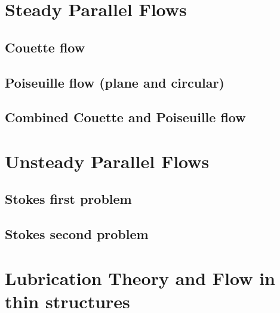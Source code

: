 \documentclass[oneside,a4paper,11pt]{report}
\begin{document}
\section{Steady Parallel Flows}

\subsection{Couette flow} 

\subsection{Poiseuille flow (plane and circular)}

\subsection{Combined Couette and Poiseuille flow}

\section{Unsteady Parallel Flows}

\subsection{Stokes first problem}

\subsection{Stokes second problem}

\section{Lubrication Theory and Flow in thin structures}
\end{document}

